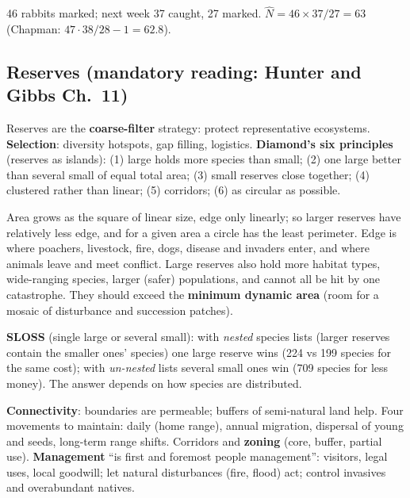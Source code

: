 \begin{worked}
46 rabbits marked; next week 37 caught, 27 marked. $\hat N=46\times37/27=63$ (Chapman: $47\cdot38/28-1=62.8$).
\end{worked}

\subsection{Reserves (mandatory reading: Hunter and Gibbs Ch.\ 11)}
Reserves are the \textbf{coarse-filter} strategy: protect representative ecosystems. \textbf{Selection}: diversity
hotspots, gap filling, logistics. \textbf{Diamond's six principles} (reserves as islands): (1) large holds more species
than small; (2) one large better than several small of equal total area; (3) small reserves close together;
(4) clustered rather than linear; (5) corridors; (6) as circular as possible.

\begin{chain}
Area grows as the square of linear size, edge only linearly; so larger reserves have relatively less edge, and for a
given area a circle has the least perimeter. Edge is where poachers, livestock, fire, dogs, disease and invaders enter,
and where animals leave and meet conflict. Large reserves also hold more habitat types, wide-ranging species, larger
(safer) populations, and cannot all be hit by one catastrophe. They should exceed the \textbf{minimum dynamic area}
(room for a mosaic of disturbance and succession patches).
\end{chain}

\textbf{SLOSS} (single large or several small): with \emph{nested} species lists (larger reserves contain the smaller ones'
species) one large reserve wins (224 vs 199 species for the same cost); with \emph{un-nested} lists several small ones win
(709 species for less money). The answer depends on how species are distributed.

\textbf{Connectivity}: boundaries are permeable; buffers of semi-natural land help. Four movements to maintain: daily
(home range), annual migration, dispersal of young and seeds, long-term range shifts. Corridors and \textbf{zoning} (core,
buffer, partial use). \textbf{Management} ``is first and foremost people management'': visitors, legal uses, local
goodwill; let natural disturbances (fire, flood) act; control invasives and overabundant natives.

